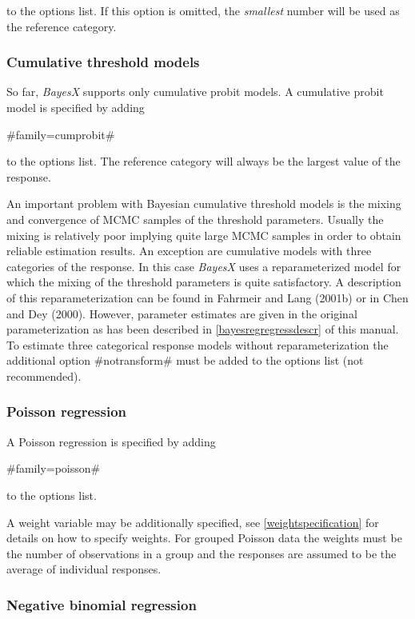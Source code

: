 to the options list. If this option is omitted, the {\em smallest}
number will be used as the reference category.

\subsubsection*{Cumulative threshold models}

So far, {\em BayesX} supports only cumulative probit models. A
cumulative probit model is specified by adding

#family=cumprobit#

to the options list. The reference category will always be the
largest value of the response.

An important problem with Bayesian cumulative  threshold models is
the mixing and convergence of MCMC samples of the threshold
parameters. Usually the mixing is relatively poor implying quite
large MCMC samples in order to obtain reliable estimation results.
An exception are cumulative models with three categories of the
response. In this case {\em BayesX} uses a reparameterized model
for which the mixing of the threshold parameters is quite
satisfactory. A description of this reparameterization can be
found in Fahrmeir and Lang (2001b) or in Chen and Dey (2000).
However, parameter estimates are given in the original
parameterization as has been described in
\autoref{bayesregregressdescr} of this manual. To estimate three
categorical response models without reparameterization the
additional option #notransform# must be added to the options list
(not recommended).

\subsubsection*{Poisson regression}

A Poisson regression is specified by adding

#family=poisson#

to the options list.

A weight variable may be additionally specified, see
\autoref{weightspecification} for details on how to specify
weights. For grouped Poisson data the weights must be the number
of observations in a group and the responses are assumed to be the
average of individual responses.

\subsubsection*{Negative binomial regression}

